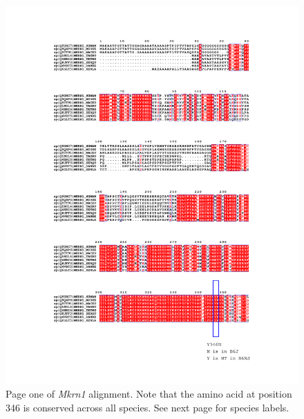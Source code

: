    \begin{figure}
        \includegraphics[width=0.8\linewidth]{images/kumar_alignment_supplement.pdf}
        \caption{Page one of \textit{Mkrn1} alignment.  Note that the amino acid at position 346 is conserved across all species.  See next page for species labels.}
        \label{fig:mkrn1_alignment}
    \end{figure}

